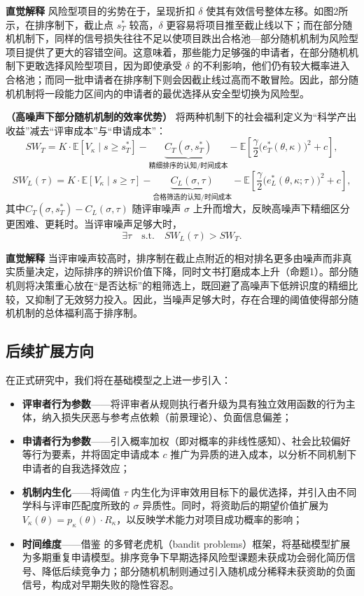 \noindent\textbf{直觉解释} \quad 
风险型项目的劣势在于，呈现折扣 $\delta$ 使其有效信号整体左移。如图2所示，在排序制下，截止点 $s_T^*$ 较高，$\delta$ 更容易将项目推至截止线以下；而在部分随机机制下，同样的信号损失往往不足以使项目跌出合格池—部分随机机制为风险型项目提供了更大的容错空间。这意味着，那些能力足够强的申请者，在部分随机机制下更敢选择风险型项目，因为即使承受 $\delta$ 的不利影响，他们仍有较大概率进入合格池；而同一批申请者在排序制下则会因截止线过高而不敢冒险。因此，部分随机机制将一段能力区间内的申请者的最优选择从安全型切换为风险型。



\begin{proposition}
\textbf{（高噪声下部分随机机制的效率优势）}\quad
将两种机制下的社会福利定义为“科学产出收益”减去“评审成本”与“申请成本”：
$$
SW_T=K\cdot\mathbb{E}\!\left[V_\kappa \mid s\ge s_T^*\right]
-\underbrace{C_T(\sigma,s_T^*)}_{\text{精细排序的认知/时间成本}}
-\mathbb{E}\!\left[\frac{\gamma}{2}\big(e_T^*(\theta,\kappa)\big)^2+c\right],
$$
$$
SW_L(\tau)=K\cdot\mathbb{E}\!\left[V_\kappa \mid s\ge \tau\right]
-\underbrace{C_L(\sigma,\tau)}_{\text{合格筛选的认知/时间成本}}
-\mathbb{E}\!\left[\frac{\gamma}{2}\big(e_L^*(\theta,\kappa;\tau)\big)^2+c\right],
$$
其中$C_T(\sigma,s_T^*)-C_L(\sigma,\tau)$ 随评审噪声 $\sigma$ 上升而增大，反映高噪声下精细区分更困难、更耗时。当评审噪声足够大时，
$$
\exists \tau \quad\text{s.t.} \quad SW_L(\tau) > SW_T .
$$
\end{proposition}


\noindent\textbf{直觉解释} \quad 
当评审噪声较高时，排序制在截止点附近的相对排名更多由噪声而非真实质量决定，边际排序的辨识价值下降，同时文书打磨成本上升（命题1）。部分随机则将决策重心放在“是否达标”的粗筛选上，既回避了高噪声下低辨识度的精细比较，又抑制了无效努力投入。因此，当噪声足够大时，存在合理的阈值使得部分随机机制的总体福利高于排序制。


\subsection{\textbf{后续扩展方向}}

在正式研究中，我们将在基础模型之上进一步引入：
\begin{itemize}
    \item \textbf{评审者行为参数}——将评审者从规则执行者升级为具有独立效用函数的行为主体，纳入损失厌恶与参考点依赖（前景理论）、负面信息偏差；
    \item \textbf{申请者行为参数}——引入概率加权（即对概率的非线性感知）、社会比较偏好等行为要素，并将固定申请成本 $c$ 推广为异质的进入成本，以分析不同机制下申请者的自我选择效应；
    \item \textbf{机制内生化}——将阈值 $\tau$ 内生化为评审效用目标下的最优选择，并引入由不同学科与评审匹配度所致的 $\sigma$ 异质性。同时，将资助后的期望价值扩展为 $V_{\kappa}(\theta) = p_{\kappa}(\theta) \cdot R_{\kappa}$，以反映学术能力对项目成功概率的影响；
    \item \textbf{时间维度}——借鉴 \cite{mansoMotivatingInnovation2011} 的多臂老虎机（bandit problems）框架，将基础模型扩展为多期重复申请模型。排序竞争下早期选择风险型课题未获成功会弱化简历信号、降低后续竞争力；部分随机机制则通过引入随机成分稀释未获资助的负面信号，构成对早期失败的隐性容忍。
\end{itemize}

